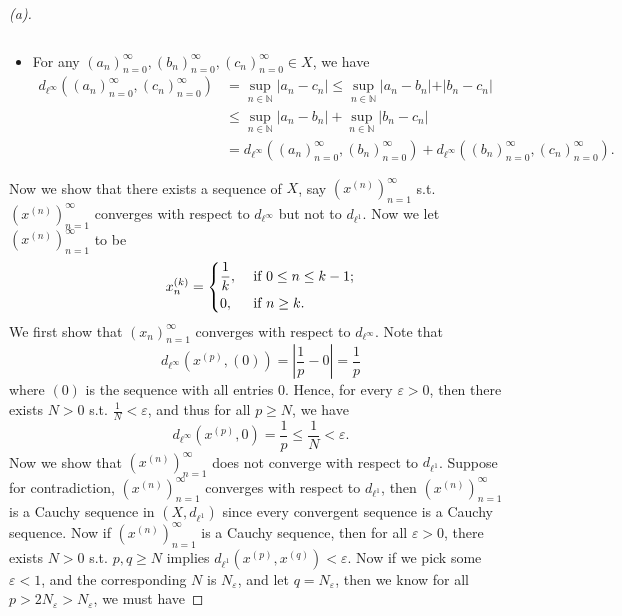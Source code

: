 \begin{proof}[(a)]
\begin{itemize}
\[    \]
    \item For any \((a_n)_{n=0}^{\infty}, (b_n)_{n=0}^{\infty}, (c_n)_{n=0}^{\infty} \in X\), we have 
   \begin{align*}
    d_{\ell ^{\infty} } \left( (a_n)_{n=0}^{\infty} , (c_n)_{n=0}^{\infty}  \right) &= \sup _{n \in \mathbb{N} } \vert a_n - c_n \vert \le \sup _{n \in \mathbb{N} } \vert a_n - b_n \vert + \vert b_n - c_n \vert \\
    &\le \sup _{n \in \mathbb{N} } \vert a_n - b_n \vert + \sup _{n \in \mathbb{N} } \vert b_n - c_n \vert \\
    &= d_{\ell ^{\infty} } \left( (a_n)_{n=0}^{\infty} , (b_n)_{n=0}^{\infty}  \right) + d_{\ell ^{\infty} } \left( (b_n)_{n=0}^{\infty} , (c_n)_{n=0}^{\infty}  \right).  
   \end{align*}
  \end{itemize} 
  Now we show that there exists a sequence of \(X\), say \(\left( x^{(n)} \right)_{n=1}^{\infty}  \) s.t. \(\left( x^{(n)} \right)_{n=1}^{\infty}  \) converges with respect to \(d_{\ell ^{\infty} }\) but not to \(d_{\ell ^1}\). Now we let \(\left( x^{(n)} \right)_{n=1}^{\infty}  \) to be
  \[
    x^{(k)}_n = \begin{dcases}
      \frac{1}{k}, &\text{ if } 0 \le n \le k - 1;\\
      0 , &\text{ if } n \ge k .
    \end{dcases}
  \]    
  We first show that \(\left( x_n \right)_{n=1}^{\infty}  \) converges with respect to \(d_{\ell ^{\infty} }\). Note that 
  \[
    d_{\ell ^{\infty} } \left( x^{(p)}, (0) \right) = \left\vert \frac{1}{p} - 0 \right\vert = \frac{1}{p} 
  \] where \((0)\) is the sequence with all entries \(0\). Hence, for every \(\varepsilon > 0\), then there exists \(N > 0\) s.t. \(\frac{1}{N} < \varepsilon \), and thus for all \(p \ge N\), we have 
  \[
    d_{\ell ^{\infty} } \left( x^{(p)}, 0 \right) = \frac{1}{p} \le \frac{1}{N} < \varepsilon. 
  \] Now we show that \(\left( x^{(n)} \right)_{n=1}^{\infty}  \) does not converge with respect to \(d_{\ell ^1}\). Suppose for contradiction, \(\left( x^{(n)} \right)_{n=1}^{\infty}\) converges with respect to \(d_{\ell ^1}\), then \(\left( x^{(n)} \right)_{n=1}^{\infty}\) is a Cauchy sequence in \((X, d_{\ell ^1})\) since every convergent sequence is a Cauchy sequence. Now if \(\left( x^{(n)} \right)_{n=1}^{\infty}\) is a Cauchy sequence, then for all \(\varepsilon > 0\), there exists \(N > 0\) s.t. \(p, q \ge N\) implies \(d_{\ell ^1} \left( x^{(p)}, x^{(q)} \right) < \varepsilon  \). Now if we pick some \(\varepsilon < 1\), and the corresponding \(N\) is \(N_{\varepsilon } \), and let \(q = N_{\varepsilon } \), then we know for all \(p > 2N_{\varepsilon } > N_{\varepsilon } \), we must have 

\end{proof}

